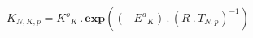 \documentclass[border=2pt]{standalone}
\begin{document}
${K}{_{N, K, p}}={{K^o}}{_{K}} \, . \, \textbf{exp}\left(\left( -{{E^a}}{_{K}} \right) \, . \, \left( {R}{_{}} \, . \, {T}{_{N, p}} \right)^{-1}\right)$
\end{document}
